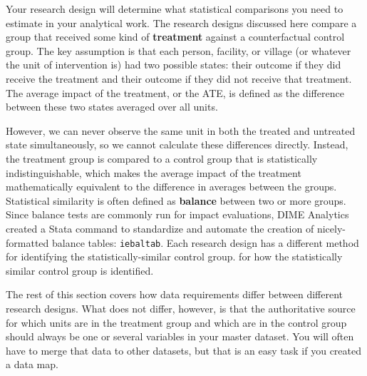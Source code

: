 Your research design will determine what statistical comparisons you need
to estimate in your analytical work.
The research designs discussed here compare a group that received
some kind of \textbf{treatment}
against a counterfactual control group.
The key assumption is that each
person, facility, or village (or whatever the unit of intervention is)
had two possible states: their outcome if they did receive the treatment
and their outcome if they did not receive that treatment.
The average impact of the treatment, or the ATE,
is defined as the difference 
between these two states averaged over all units.

However, we can never observe the same unit
in both the treated and untreated state simultaneously,
so we cannot calculate these differences directly.
Instead, the treatment group is compared to a control group
that is statistically indistinguishable,
which makes the average impact of the treatment
mathematically equivalent to the difference in averages between the groups.
Statistical similarity is often defined
as \textbf{balance} between two or more groups.	
Since balance tests are commonly run for impact evaluations,
DIME Analytics created a Stata command to 
standardize and automate the creation of nicely-formatted balance tables:
\texttt{iebaltab}.
Each research design has a different method	for identifying the statistically-similar control group. 
for how the statistically similar control group is identified.

The rest of this section covers how data requirements differ
between different research designs.
What does not differ, however, is that the authoritative source
for which units are in the treatment group and which are in the control group
should always be one or several variables in your master dataset. 
You will often have to merge that data to other datasets, 
but that is an easy task if you created a data map.

